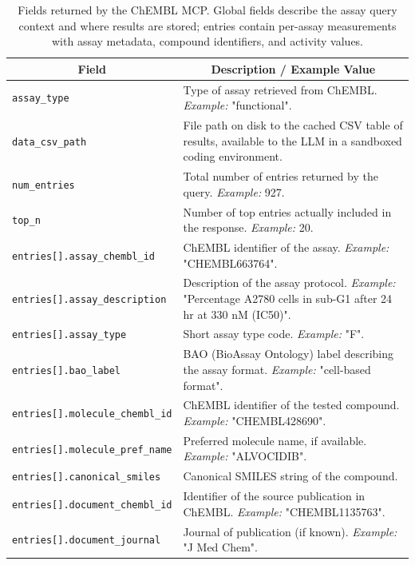 \documentclass{article}
\begin{document}
\begin{table}[!htbp]
\caption{Fields returned by the ChEMBL MCP. Global fields describe the assay query context and where results are stored; entries contain per-assay measurements with assay metadata, compound identifiers, and activity values.}
\label{tab:chembl-mcp}
\begin{center}
\begin{tabularx}{\textwidth}{p{6cm}X}
\toprule
\multicolumn{1}{c}{\bf Field} & \multicolumn{1}{c}{\bf Description / Example Value} \\
\midrule
\texttt{assay\_type} & Type of assay retrieved from ChEMBL. \emph{Example:} "functional". \\
\addlinespace
\texttt{data\_csv\_path} & File path on disk to the cached CSV table of results, available to the LLM in a sandboxed coding environment. \\
\addlinespace
\texttt{num\_entries} & Total number of entries returned by the query. \emph{Example:} 927. \\
\addlinespace
\texttt{top\_n} & Number of top entries actually included in the response. \emph{Example:} 20. \\
\addlinespace
\texttt{entries[].assay\_chembl\_id} & ChEMBL identifier of the assay. \emph{Example:} "CHEMBL663764". \\
\addlinespace
\texttt{entries[].assay\_description} & Description of the assay protocol. \emph{Example:} "Percentage A2780 cells in sub-G1 after 24 hr at 330 nM (IC50)". \\
\addlinespace
\texttt{entries[].assay\_type} & Short assay type code. \emph{Example:} "F". \\
\addlinespace
\texttt{entries[].bao\_label} & BAO (BioAssay Ontology) label describing the assay format. \emph{Example:} "cell-based format". \\
\addlinespace
\texttt{entries[].molecule\_chembl\_id} & ChEMBL identifier of the tested compound. \emph{Example:} "CHEMBL428690". \\
\addlinespace
\texttt{entries[].molecule\_pref\_name} & Preferred molecule name, if available. \emph{Example:} "ALVOCIDIB". \\
\addlinespace
\texttt{entries[].canonical\_smiles} & Canonical SMILES string of the compound. \\
\addlinespace
\texttt{entries[].document\_chembl\_id} & Identifier of the source publication in ChEMBL. \emph{Example:} "CHEMBL1135763". \\
\addlinespace
\texttt{entries[].document\_journal} & Journal of publication (if known). \emph{Example:} "J Med Chem". \\

\end{tabularx}
\end{center}
\end{table}
\end{document}
